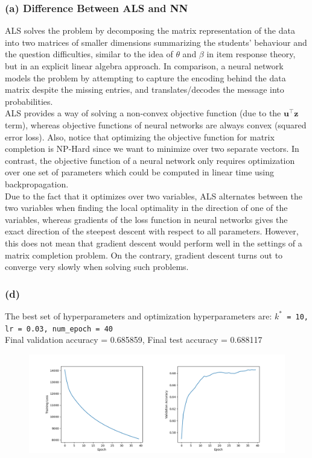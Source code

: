 \documentclass{article}
\newcommand{\coding}[1]{\colorbox{light-gray}{\texttt{#1}}}
\begin{document}
\begin{spacing}{1.5}
\subsubsection*{(a) Difference Between ALS and NN}
ALS solves the problem by decomposing the matrix representation of the data into two matrices of smaller dimensions summarizing the students’ behaviour and the question difficulties, similar to the idea of $\theta$ and $\beta$ 
in item response theory, but in an explicit linear algebra approach. In comparison, a neural network models the problem by attempting to capture the encoding behind the data matrix despite the missing entries, and 
translates/decodes the message into probabilities. \\
ALS provides a way of solving a non-convex objective function (due to the $\bm{u}^\top\bm{z}$ term), whereas objective functions of neural networks are always convex (squared error loss). Also, notice that optimizing the objective 
function for matrix completion is NP-Hard since we want to minimize over two separate vectors. In contrast, the objective function of a neural network only requires optimization over one set of parameters which could 
be computed in linear time using backpropagation.  \\
Due to the fact that it optimizes over two variables, ALS alternates between the two variables when finding the local optimality in the direction of one of the variables, whereas gradients of the loss function in 
neural networks gives the exact direction of the steepest descent with respect to all parameters. However, this does not mean that gradient descent would perform well in the settings of a matrix completion problem. 
On the contrary, gradient descent turns out to converge very slowly when solving such problems. 

\subsubsection*{(d)}
The best set of hyperparameters and optimization hyperparameters are: \coding{$k^*$ = 10, lr = 0.03, num\_epoch = 40}\\
Final validation accuracy = 0.685859, Final test accuracy = 0.688117
\begin{figure}[htbp]
	\includegraphics[scale=0.4]{nn_unregularized.png}
\end{figure}

\end{spacing}
\end{document}
